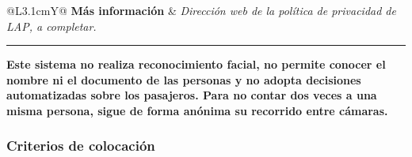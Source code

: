 {\begin{minipage}{\dimexpr\linewidth-2\fboxsep-2\fboxrule\relax}
\begin{tabularx}{\linewidth}{@{}L{3.1cm}Y@{}}
\textbf{Más información} &
\emph{Dirección web de la política de privacidad de LAP, a completar.} \\
\end{tabularx}

\vspace{0.4em}
\noindent\rule{\linewidth}{0.8pt}
\vspace{0.2em}

{\footnotesize\bfseries Este sistema no realiza reconocimiento facial, no
permite conocer el nombre ni el documento de las personas y no adopta
decisiones automatizadas sobre los pasajeros. Para no contar dos veces a una
misma persona, sigue de forma anónima su recorrido entre cámaras.}

\vspace{0.6em}
\end{minipage}%
}
\vspace{0.8em}

\subsubsection{Criterios de colocación}

